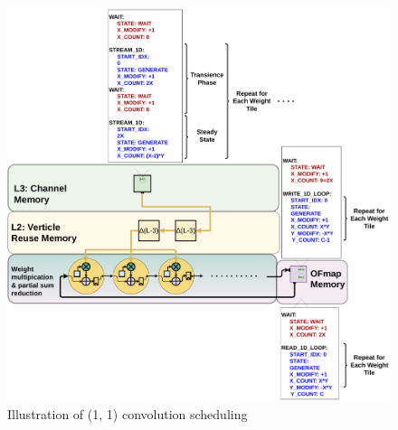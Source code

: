 \begin{figure}[ht]
    \centering
    \includegraphics[scale=0.495]{fig/3x3conv_sched.pdf}
    \caption{Illustration of (1, 1) convolution scheduling}
    \label{fig:3x3conv_sched}
\end{figure}